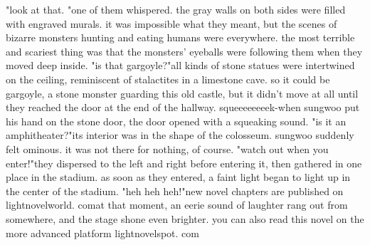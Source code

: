 "look at that.
"one of them whispered.
the gray walls on both sides were filled with engraved murals.
 it was impossible what they meant, but the scenes of bizarre monsters hunting and eating humans were everywhere.
 the most terrible and scariest thing was that the monsters' eyeballs were following them when they moved deep inside.
"is that gargoyle?"all kinds of stone statues were intertwined on the ceiling, reminiscent of stalactites in a limestone cave.
 so it could be gargoyle, a stone monster guarding this old castle, but it didn't move at all until they reached the door at the end of the hallway.
squeeeeeeeek-when sungwoo put his hand on the stone door, the door opened with a squeaking sound.
"is it an amphitheater?"its interior was in the shape of the colosseum.
 sungwoo suddenly felt ominous.
 it was not there for nothing, of course.
 "watch out when you enter!"they dispersed to the left and right before entering it, then gathered in one place in the stadium.
as soon as they entered, a faint light began to light up in the center of the stadium.
"heh heh heh!"new novel chapters are published on lightnovelworld.
c­omat that moment, an eerie sound of laughter rang out from somewhere, and the stage shone even brighter.
 you can also read this novel on the more advanced platform lightnovelspot.
com

 